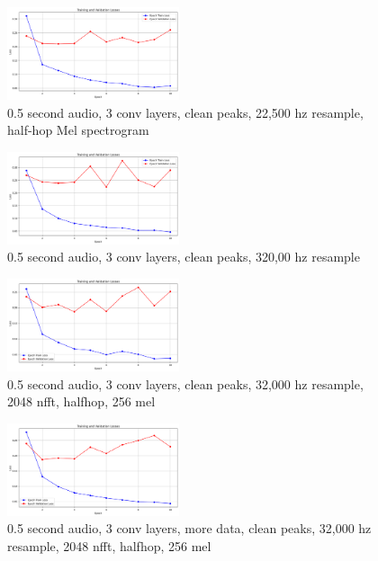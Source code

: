 \documentclass[twocolumn]{article}
\begin{document}
\begin{figure}
\centering
\includegraphics[width=0.45\textwidth]{figures/loss_plot_halfs_3conv_cleanpeaks_22500resample_halfhop.png}
\caption{0.5 second audio, 3 conv layers, clean peaks, 22,500 hz resample, half-hop Mel spectrogram}
\label{fig:halfs_3conv_cleanpeaks_22500hz_halfhop}
\end{figure}

\begin{figure}
\centering
\includegraphics[width=0.45\textwidth]{figures/loss_plot_halfs_3conv_cleanpeaks_32000resample.png}
\caption{0.5 second audio, 3 conv layers, clean peaks, 320,00 hz resample}
\label{fig:halfs_3conv_cleanpeaks_32000hz}
\end{figure}

\begin{figure}
\centering
\includegraphics[width=0.45\textwidth]{figures/loss_plot_halfs_3conv_cleanpeaks_3200resample_2048nfft_halfhop_256nmel.png}
\caption{0.5 second audio, 3 conv layers, clean peaks, 32,000 hz resample, 2048 nfft, halfhop, 256 mel}
\label{fig:halfs_3conv_cleanpeaks_3200resample_2048nfft_halfhop_256nmel}
\end{figure}

\begin{figure}
\centering
\includegraphics[width=0.45\textwidth]{figures/loss_plot_moredata_halfs_3conv_cleanpeaks_3200resample_2048nfft_halfhop_256nmel.png}
\caption{0.5 second audio, 3 conv layers, more data, clean peaks, 32,000 hz resample, 2048 nfft, halfhop, 256 mel}
\label{fig:halfs_3conv_moredata_cleanpeaks_3200resample_2048nfft_halfhop_256nmel}
\end{figure}
\end{document}
